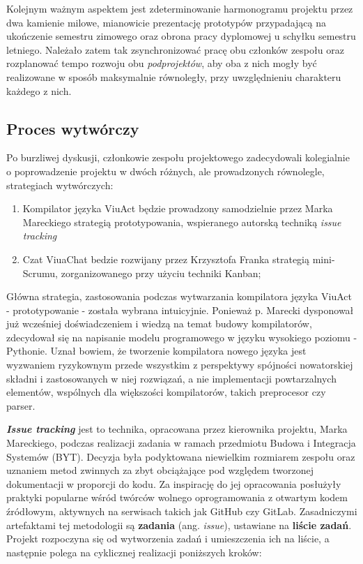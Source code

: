 \documentclass[11pt,oneside,a4paper,titlepage,onecolumn]{article}
\begin{document}
Kolejnym ważnym aspektem jest zdeterminowanie harmonogramu projektu przez dwa kamienie milowe, mianowicie prezentację prototypów przypadającą na ukończenie semestru zimowego oraz obrona pracy dyplomowej u schyłku semestru letniego. Należało zatem tak zsynchronizować pracę obu członków zespołu oraz rozplanować tempo rozwoju obu \textit{podprojektów}, aby oba z nich mogły być realizowane w sposób maksymalnie równoległy, przy uwzględnieniu charakteru każdego z nich.

\subsection{Proces wytwórczy}

Po burzliwej dyskusji, członkowie zespołu projektowego zadecydowali kolegialnie o poprowadzenie projektu w dwóch
różnych, ale prowadzonych równolegle, strategiach wytwórczych:

\begin{enumerate}
	\item Kompilator języka ViuAct będzie prowadzony samodzielnie przez Marka Mareckiego strategią prototypowania, wspieranego autorską techniką \textit{issue tracking}
	\item Czat ViuaChat bedzie rozwijany przez Krzysztofa Franka strategią mini-Scrumu, zorganizowanego przy użyciu techniki Kanban;
\end{enumerate}

Główna strategia, zastosowania podczas wytwarzania kompilatora języka ViuAct - prototypowanie - została 
wybrana intuicyjnie. Ponieważ p. Marecki dysponował już wcześniej 
doświadczeniem i wiedzą na temat budowy kompilatorów, zdecydował się na napisanie modelu programowego w
języku wysokiego poziomu - Pythonie. Uznał bowiem, że tworzenie kompilatora nowego języka jest wyzwaniem 
ryzykownym przede wszystkim z perspektywy spójności nowatorskiej składni i zastosowanych w niej rozwiązań, a nie 
implementacji powtarzalnych elementów, wspólnych dla większości kompilatorów, takich preprocesor czy parser.

\textit{\textbf{Issue tracking}} jest to technika, opracowana przez kierownika projektu, Marka Mareckiego, podczas
realizacji zadania w ramach przedmiotu Budowa i Integracja Systemów (BYT). Decyzja była podyktowana niewielkim
rozmiarem zespołu oraz uznaniem metod zwinnych za zbyt obciążające pod względem tworzonej dokumentacji w proporcji 
do kodu. Za inspirację do jej opracowania posłużyły praktyki popularne wśród twórców wolnego oprogramowania z 
otwartym kodem źródłowym, aktywnych na serwisach takich jak GitHub czy GitLab. Zasadniczymi artefaktami tej 
metodologii są \textbf{zadania} (ang. \textit{issue}), ustawiane na \textbf{liście zadań}. Projekt rozpoczyna się 
od wytworzenia zadań i umieszczenia ich na liście, a następnie polega na cyklicznej realizacji poniższych kroków:
\end{document}
